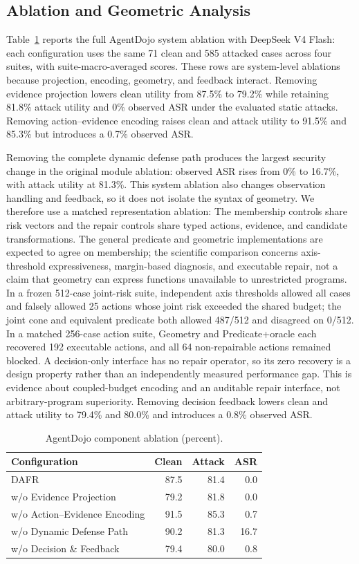 \documentclass[11pt]{article}
\begin{document}
\subsection{Ablation and Geometric Analysis}

Table~\ref{tab:ablation} reports the full AgentDojo system ablation with DeepSeek V4 Flash: each configuration uses the same 71 clean and 585 attacked cases across four suites, with suite-macro-averaged scores. These rows are system-level ablations because projection, encoding, geometry, and feedback interact. Removing evidence projection lowers clean utility from 87.5\% to 79.2\% while retaining 81.8\% attack utility and 0\% observed ASR under the evaluated static attacks. Removing action--evidence encoding raises clean and attack utility to 91.5\% and 85.3\% but introduces a 0.7\% observed ASR.

Removing the complete dynamic defense path produces the largest security change in the original module ablation: observed ASR rises from 0\% to 16.7\%, with attack utility at 81.3\%. This system ablation also changes observation handling and feedback, so it does not isolate the syntax of geometry. We therefore use a matched representation ablation: The membership controls share risk vectors and the repair controls share typed actions, evidence, and candidate transformations. The general predicate and geometric implementations are expected to agree on membership; the scientific comparison concerns axis-threshold expressiveness, margin-based diagnosis, and executable repair, not a claim that geometry can express functions unavailable to unrestricted programs. In a frozen 512-case joint-risk suite, independent axis thresholds allowed all cases and falsely allowed 25 actions whose joint risk exceeded the shared budget; the joint cone and equivalent predicate both allowed 487/512 and disagreed on 0/512. In a matched 256-case action suite, Geometry and Predicate+oracle each recovered 192 executable actions, and all 64 non-repairable actions remained blocked. A decision-only interface has no repair operator, so its zero recovery is a design property rather than an independently measured performance gap. This is evidence about coupled-budget encoding and an auditable repair interface, not arbitrary-program superiority. Removing decision feedback lowers clean and attack utility to 79.4\% and 80.0\% and introduces a 0.8\% observed ASR.

\begin{table}[ht]
\centering
\scriptsize
\setlength{\tabcolsep}{1.5pt}
\begin{tabular}{lrrr}
\toprule
Configuration & Clean & Attack & ASR\\
\midrule
DAFR & 87.5 & 81.4 & 0.0\\
w/o Evidence Projection & 79.2 & 81.8 & 0.0\\
w/o Action--Evidence Encoding & 91.5 & 85.3 & 0.7\\
w/o Dynamic Defense Path & 90.2 & 81.3 & 16.7\\
w/o Decision \& Feedback & 79.4 & 80.0 & 0.8\\
\bottomrule
\end{tabular}
\caption{AgentDojo component ablation (percent).}
\label{tab:ablation}
\end{table}
\end{document}

